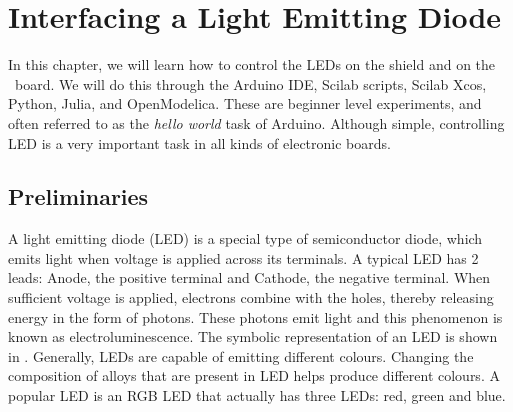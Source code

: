 \chapter {Interfacing a Light Emitting Diode}
\thispagestyle{empty}
\label{led}
\newcommand{\LocLEDfig}{\Origin/user-code/led/figures}
\newcommand{\LocLEDscicode}{\Origin/user-code/led/scilab}
\newcommand{\LocLEDscibrief}[1]{{\tt \seqsplit{%
        Origin/user-code/led/scilab/#1}}, see \fnrefp{fn:file-loc}}
\newcommand{\LocLEDardcode}{\Origin/user-code/led/arduino}
\newcommand{\LocLEDardbrief}[1]{{\tt \seqsplit{%
        Origin/user-code/led/arduino/#1}}, see \fnrefp{fn:file-loc}}

\newcommand{\LocLEDpycode}{\Origin/user-code/led/python}  %
\newcommand{\LocLEDpybrief}[1]{{\tt \seqsplit{%
        Origin/user-code/led/python/#1}}, see \fnrefp{fn:file-loc}} %


\newcommand{\LocLEDjuliacode}{\Origin/user-code/led/julia}  %
\newcommand{\LocLEDjuliabrief}[1]{{\tt \seqsplit{%
        Origin/user-code/led/julia/#1}}, see \fnrefp{fn:file-loc}} %

\newcommand{\LocLEDOpenModelicacode}{\Origin/user-code/led/OpenModelica}  %
\newcommand{\LocLEDOpenModelicabrief}[1]{{\tt \seqsplit{%
        Origin/user-code/led/OpenModelica/#1}}, see \fnrefp{fn:file-loc}} %


In this chapter, we will learn how to control the LEDs on the shield
and on the \arduino\ board.  We will do this through the Arduino IDE,
Scilab scripts, Scilab Xcos, Python, Julia, and OpenModelica.  
These are beginner level experiments,
and often referred to as the \emph{hello world} task of Arduino.
Although simple, controlling LED is a very important task in all
kinds of electronic boards.

\section{Preliminaries}
\label{sec:led-pril}
A light emitting diode (LED) is a special type of semiconductor diode,
which emits light when voltage is applied across its terminals. A
typical LED has 2 leads: Anode, the positive terminal and Cathode, the
negative terminal.  When sufficient voltage is applied, electrons
combine with the holes, thereby releasing energy in the form of
photons.  These photons emit light and this phenomenon is known as
electroluminescence.  The symbolic representation of an LED is shown
in .  Generally, LEDs are capable of emitting
different colours.  Changing the composition of alloys that are
present in LED helps produce different colours.  A popular LED is an
RGB LED that actually has three LEDs: red, green and blue.

